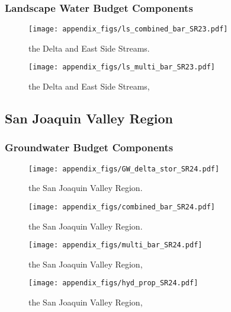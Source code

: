 \subsubsection{Landscape Water Budget Components}
\begin{figure}[ht]
\centerline{\texttt{[image: appendix\_figs/ls\_combined\_bar\_SR23.pdf]}}
\caption{\LSCombinedTextOne the Delta and East Side Streams.\LSCombinedTextTwo}
\label{fig:LS_budget_SR23}
\end{figure}
\newpage

\begin{landscape}
\begin{figure}[ht]
\centerline{\texttt{[image: appendix\_figs/ls\_multi\_bar\_SR23.pdf]}}
\caption{\LSMultiTextOne the Delta and East Side Streams,\LSMultiTextTwo}
\label{fig:multi_LS_budget_SR23}
\end{figure}
\newpage
\end{landscape}

\subsection{San Joaquin Valley Region}
\subsubsection{Groundwater Budget Components}
\begin{figure}[h]
\centerline{\texttt{[image: appendix\_figs/GW\_delta\_stor\_SR24.pdf]}}
\caption{\GWBudgetText the San Joaquin Valley Region.}
\label{fig:delta_stor_SR24}
\end{figure}
\newpage

\begin{figure}[ht]
\centerline{\texttt{[image: appendix\_figs/combined\_bar\_SR24.pdf]}}
\caption{\GWCombinedTextOne the San Joaquin Valley Region.\GWCombinedTextTwo}
\label{fig:GW_budget_SR24}
\end{figure}
\newpage

\begin{landscape}
\begin{figure}[ht]
\centerline{\texttt{[image: appendix\_figs/multi\_bar\_SR24.pdf]}}
\caption{\GWMultiTextOne the San Joaquin Valley Region,\GWMultiTextTwo}
\label{fig:multi_GW_budget_SR24}
\end{figure}
\newpage

\begin{figure}[ht]
\centerline{\texttt{[image: appendix\_figs/hyd\_prop\_SR24.pdf]}}
\caption{\HydPropOne the San Joaquin Valley Region,\HydPropTwo}
\label{fig:hyd_prop_SR24}
\end{figure}
\newpage
\end{landscape}

